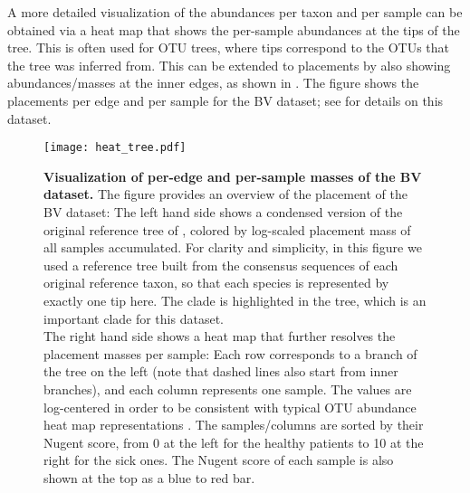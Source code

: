 A more detailed visualization of the abundances per taxon and per sample 
can be obtained via a heat map that shows the per-sample abundances at the tips of the tree.
This is often used for OTU trees, where tips correspond to the OTUs that the tree was inferred from.
This can be extended to placements by also showing abundances/masses at the inner edges, 
as shown in .
The figure shows the placements per edge and per sample for the \ac{BV} dataset;
see  for details on this dataset.


\begin{figure}[!htbp]
    \centering
    \vspace{-1em}
    \texttt{[image: heat\_tree.pdf]}
    \caption[Visualization of per-edge and per-sample masses of the BV dataset]{
        \textbf{Visualization of per-edge and per-sample masses of the BV dataset.}
        The figure provides an overview of the placement of the \ac{BV} dataset:
        The left hand side shows a condensed version of the original reference tree of ,
        colored by log-scaled placement mass of all samples accumulated.
        For clarity and simplicity, in this figure we used a reference tree
        built from the consensus sequences of each original reference taxon,
        so that each species is represented by exactly one tip here.
        The  clade is highlighted in the tree, which is an important clade for this dataset.
        \\
        The right hand side shows a heat map that further resolves the placement masses per sample:
        Each row corresponds to a branch of the tree on the left (note that dashed lines also start from inner branches),
        and each column represents one sample.
        The values are log-centered in order to
        be consistent with typical OTU abundance heat map representations \cite{Washburne2017a}.
        The samples/columns are sorted by their Nugent score,
        from \num{0} at the left for the healthy patients to \num{10} at the right for the sick ones.
        The Nugent score of each sample is also shown at the top as a blue to red bar.
    }
    \label{fig:heat_tree}
\end{figure}

